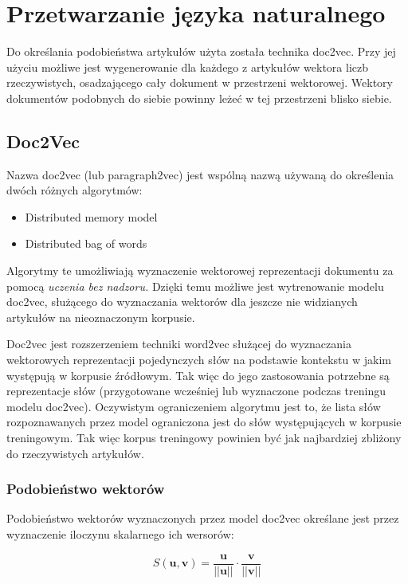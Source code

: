 \section{Przetwarzanie języka naturalnego}

Do określania podobieństwa artykułów użyta została technika
doc2vec. Przy jej użyciu możliwe jest wygenerowanie dla każdego z
artykułów wektora liczb rzeczywistych, osadzającego cały dokument w
przestrzeni wektorowej. Wektory dokumentów podobnych do siebie powinny
leżeć w tej przestrzeni blisko siebie.


\subsection{Doc2Vec}

Nazwa doc2vec\cite{doc2vec} (lub paragraph2vec) jest wspólną nazwą używaną do
określenia dwóch różnych algorytmów:

\begin{itemize}
\item Distributed memory model
\item Distributed bag of words
\end{itemize}

Algorytmy te umożliwiają wyznaczenie wektorowej reprezentacji dokumentu za pomocą \textit{uczenia bez nadzoru.} Dzięki temu możliwe jest wytrenowanie modelu doc2vec, służącego do wyznaczania wektorów dla jeszcze nie widzianych artykułów na nieoznaczonym korpusie.

Doc2vec jest rozszerzeniem techniki word2vec służącej do wyznaczania
wektorowych reprezentacji pojedynczych słów na podstawie kontekstu w
jakim występują w korpusie źródłowym. Tak więc do jego zastosowania
potrzebne są reprezentacje słów (przygotowane wcześniej lub wyznaczone
podczas treningu modelu doc2vec). Oczywistym ograniczeniem algorytmu
jest to, że lista słów rozpoznawanych przez model ograniczona jest do
słów występujących w korpusie treningowym. Tak więc korpus treningowy
powinien być jak najbardziej zbliżony do rzeczywistych artykułów.

\subsubsection{Podobieństwo wektorów}

Podobieństwo wektorów wyznaczonych przez model doc2vec określane jest
przez wyznaczenie iloczynu skalarnego ich wersorów:

\begin{equation}
  S(\mathbf{u},\mathbf{v}) = \frac{\mathbf{u}}{||\mathbf{u}||} \cdot \frac{\mathbf{v}}{||\mathbf{v}||}
\end{equation}

